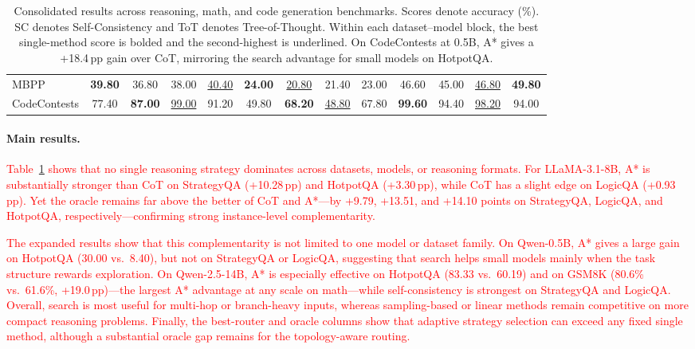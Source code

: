 \documentclass[11pt]{article}
\begin{document}
\begin{table}[t]
{\begin{tabular}{lcccc|cccc|cccc}
MBPP
& \textbf{39.80} & 36.80 & 38.00 & \underline{40.40}
& \textbf{24.00} & \underline{20.80} & 21.40 & 23.00
& 46.60 & 45.00 & \underline{46.80} & \textbf{49.80} \\

CodeContests
& 77.40 & \textbf{87.00} & \underline{99.00} & 91.20
& 49.80 & \textbf{68.20} & \underline{48.80} & 67.80
& \textbf{99.60} & 94.40 & \underline{98.20} & 94.00 \\
\bottomrule
\end{tabular}
}
\caption{Consolidated results across reasoning, math, and code generation benchmarks. Scores denote accuracy (\%). SC denotes Self-Consistency and ToT denotes Tree-of-Thought. Within each dataset--model block, the best single-method score is bolded and the second-highest is underlined. On CodeContests at 0.5B, A* gives a +18.4\,pp gain over CoT, mirroring the search advantage for small models on HotpotQA.}
\label{tab:consolidated-main-results}
\end{table}




\paragraph{Main results.}
\textcolor{red}{Table~\ref{tab:consolidated-main-results} shows that no single reasoning strategy dominates across datasets, models, or reasoning formats. For LLaMA-3.1-8B, A* is substantially stronger than CoT on StrategyQA (+10.28\,pp) and HotpotQA (+3.30\,pp), while CoT has a slight edge on LogicQA (+0.93\,pp). Yet the oracle remains far above the better of CoT and A*---by +9.79, +13.51, and +14.10 points on StrategyQA, LogicQA, and HotpotQA, respectively---confirming strong instance-level complementarity. }

\textcolor{red}{The expanded results show that this complementarity is not limited to one model or dataset family. On Qwen-0.5B, A* gives a large gain on HotpotQA (30.00 vs.\ 8.40), but not on StrategyQA or LogicQA, suggesting that search helps small models mainly when the task structure rewards exploration. On Qwen-2.5-14B, A* is especially effective on HotpotQA (83.33 vs.\ 60.19) and on GSM8K (80.6\% vs.\ 61.6\%, +19.0\,pp)---the largest A* advantage at any scale on math---while self-consistency is strongest on StrategyQA and LogicQA. Overall, search is most useful for multi-hop or branch-heavy inputs, whereas sampling-based or linear methods remain competitive on more compact reasoning problems. Finally, the best-router and oracle columns show that adaptive strategy selection can exceed any fixed single method, although a substantial oracle gap remains for the topology-aware routing.}
\end{document}
